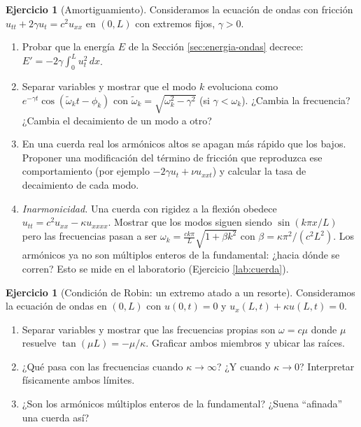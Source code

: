 \documentclass[12pt, a4paper]{amsbook}
\theoremstyle{remark}
\theoremstyle{definition}
\newtheorem{ejer}[teo]{Ejercicio}
\numberwithin{section}{chapter}
\numberwithin{subsection}{section}
\numberwithin{equation}{section}
\numberwithin{figure}{chapter}
\begin{document}
\begin{ejer}[Amortiguamiento]\label{ejer:amortiguamiento}
Consideramos la ecuación de ondas con fricción $u_{tt} + 2\gamma u_t = c^2u_{xx}$ en $(0,L)$ con extremos fijos, $\gamma>0$.
\begin{enumerate}
\item Probar que la energía $E$ de la Sección \ref{sec:energia-ondas} decrece: $E' = -2\gamma\int_0^L u_t^2\,dx$.
\item Separar variables y mostrar que el modo $k$ evoluciona como $e^{-\gamma t}\cos(\tilde\omega_k t - \phi_k)$ con $\tilde\omega_k = \sqrt{\omega_k^2-\gamma^2}$ (si $\gamma<\omega_k$). ¿Cambia la frecuencia? ¿Cambia el decaimiento de un modo a otro?
\item En una cuerda real los armónicos altos se apagan más rápido que los bajos. Proponer una modificación del término de fricción que reproduzca ese comportamiento (por ejemplo $-2\gamma u_t + \nu u_{xxt}$) y calcular la tasa de decaimiento de cada modo.
\item \emph{Inarmonicidad.} Una cuerda con rigidez a la flexión obedece $u_{tt} = c^2u_{xx} - \kappa u_{xxxx}$. Mostrar que los modos siguen siendo $\sin(k\pi x/L)$ pero las frecuencias pasan a ser $\omega_k = \frac{ck\pi}{L}\sqrt{1+\beta k^2}$ con $\beta = \kappa\pi^2/(c^2L^2)$. Los armónicos ya no son múltiplos enteros de la fundamental: ¿hacia dónde se corren? Esto se mide en el laboratorio (Ejercicio \ref{lab:cuerda}).
\end{enumerate}
\end{ejer}

\begin{ejer}[Condición de Robin: un extremo atado a un resorte]
Consideramos la ecuación de ondas en $(0,L)$ con $u(0,t)=0$ y $u_x(L,t)+\kappa u(L,t) = 0$.
\begin{enumerate}
\item Separar variables y mostrar que las frecuencias propias son $\omega = c\mu$ donde $\mu$ resuelve $\tan(\mu L) = -\mu/\kappa$. Graficar ambos miembros y ubicar las raíces.
\item ¿Qué pasa con las frecuencias cuando $\kappa\to\infty$? ¿Y cuando $\kappa\to 0$? Interpretar físicamente ambos límites.
\item ¿Son los armónicos múltiplos enteros de la fundamental? ¿Suena ``afinada'' una cuerda así?
\end{enumerate}
\end{ejer}
\end{document}
